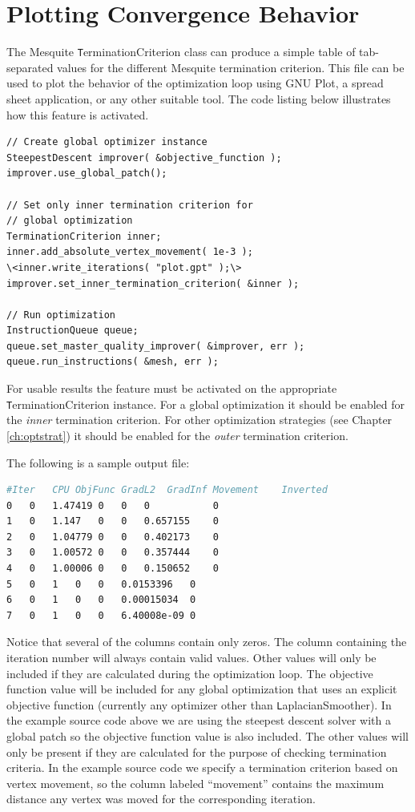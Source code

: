 \section{Plotting Convergence Behavior \label{sec:optplot}}

The Mesquite {\texttt TerminationCriterion} class can produce a simple table of tab-separated values for the different Mesquite termination criterion.	This file can be used to plot the behavior of the optimization loop using GNU Plot, a spread sheet application, or any other suitable tool.  The code listing below illustrates how this feature is activated.

\begin{lstlisting}[frame=single]
// Create global optimizer instance
SteepestDescent improver( &objective_function );
improver.use_global_patch();

// Set only inner termination criterion for
// global optimization
TerminationCriterion inner;
inner.add_absolute_vertex_movement( 1e-3 );
\<inner.write_iterations( "plot.gpt" );\>
improver.set_inner_termination_criterion( &inner );

// Run optimization
InstructionQueue queue;
queue.set_master_quality_improver( &improver, err );
queue.run_instructions( &mesh, err );
\end{lstlisting}

For usable results the feature must be activated on the appropriate {\texttt TerminationCriterion} instance.  For a global optimization it should be enabled for the {\em inner} termination criterion.	 For other optimization strategies (see Chapter \ref{ch:optstrat}) it should be enabled for the {\em outer} termination criterion.

The following is a sample output file:

\begin{lstlisting}[basicstyle=\small,language=make]
#Iter	CPU	ObjFunc GradL2	GradInf Movement	Inverted
0	0	1.47419 0	0	0	        0
1	0	1.147	0	0	0.657155	0
2	0	1.04779 0	0	0.402173	0
3	0	1.00572 0	0	0.357444	0
4	0	1.00006 0	0	0.150652	0
5	0	1	0	0	0.0153396	0
6	0	1	0	0	0.00015034	0
7	0	1	0	0	6.40008e-09	0
\end{lstlisting}

Notice that several of the columns contain only zeros.	The column containing the iteration number will always contain valid values.  Other values will only be included if they are calculated during the optimization loop.  The objective function value will be included for any global optimization that uses an explicit objective function (currently any optimizer other than {\texttt LaplacianSmoother}).  In the example source code above we are using the steepest descent solver with a global patch so the objective function value is also included.  The other values will only be present if they are calculated for the purpose of checking termination criteria.  In the example source code we specify a termination criterion based on vertex movement, so the column labeled ``movement'' contains the maximum distance any vertex was moved for the corresponding iteration.

